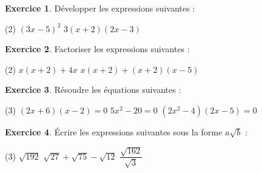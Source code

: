 \documentclass{exam}
\theoremstyle{definition}
\newtheorem{exercice}{Exercice}
\begin{document}
\large

% 

\vspace{2mm}


\vspace{2mm}

\begin{exercice}
Développer les expressions suivantes :
\begin{tasks}(2)
    \task $(3x - 5)^2$
    \task $3(x + 2)(2x - 3)$
\end{tasks}
\begin{center}
    \framebox[1\textwidth]{\parbox{5.5in}{%
    \vspace{11em}}}
\end{center}
\end{exercice}

\begin{exercice}
Factoriser les expressions suivantes :
\begin{tasks}(2)
    \task $x(x + 2) + 4x$
    \task $x(x + 2) + (x + 2)(x - 5)$
\end{tasks}
\begin{center}
    \framebox[1\textwidth]{\parbox{5.5in}{%
    \vspace{11em}}}
\end{center}
\end{exercice}

\begin{exercice}
Résoudre les équations suivantes :
\begin{tasks}(3)
    \task $(2x + 6)(x - 2) = 0$
    \task $5x^2 - 20 = 0$
    \task $(2x^2 - 4)(2x - 5) = 0$
\end{tasks}
\begin{center}
    \framebox[1\textwidth]{\parbox{5.5in}{%
    \vspace{20em}}}
\end{center}
\end{exercice}

\begin{exercice}
Écrire les expressions suivantes sous la forme $a\sqrt{b}$ :
\begin{tasks}(3)
    \task $\sqrt{192}$
    \task $\sqrt{27} + \sqrt{75} - \sqrt{12} $
    \task $\dfrac{\sqrt{162}}{\sqrt{3
    }}$
\end{tasks}
\begin{center}
    \framebox[1\textwidth]{\parbox{5.5in}{%
    \vspace{20em}}}
\end{center}
\end{exercice}
\end{document}
